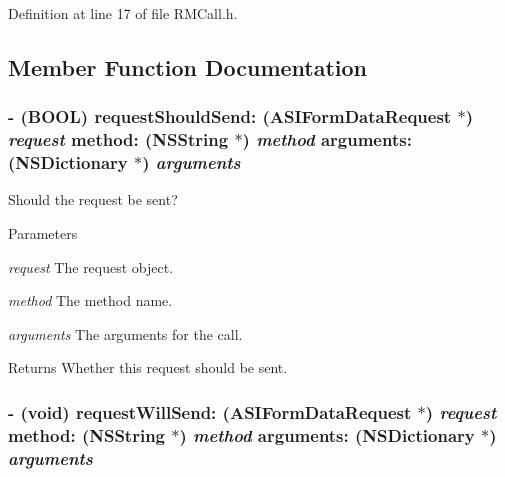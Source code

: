 Definition at line 17 of file RMCall.h.

\subsection{Member Function Documentation}
\hypertarget{protocol_r_m_call_protocol-p_a5656dcb18011d94f1d2de1e695741279}{
\subsubsection[{requestShouldSend:method:arguments:}]{\setlength{\rightskip}{0pt plus 5cm}-\/ (BOOL) requestShouldSend: (ASIFormDataRequest $\ast$) {\em request}\/ method: (NSString $\ast$) {\em method}\/ arguments: (NSDictionary $\ast$) {\em arguments}}}
\label{protocol_r_m_call_protocol-p_a5656dcb18011d94f1d2de1e695741279}


Should the request be sent? 
\begin{DoxyParams}{Parameters}
\item[{\em request}]The request object. \item[{\em method}]The method name. \item[{\em arguments}]The arguments for the call.\end{DoxyParams}
\begin{DoxyReturn}{Returns}
Whether this request should be sent. 
\end{DoxyReturn}
\hypertarget{protocol_r_m_call_protocol-p_a33f653fd32cbeae77545d77d7d80575c}{
\subsubsection[{requestWillSend:method:arguments:}]{\setlength{\rightskip}{0pt plus 5cm}-\/ (void) requestWillSend: (ASIFormDataRequest $\ast$) {\em request}\/ method: (NSString $\ast$) {\em method}\/ arguments: (NSDictionary $\ast$) {\em arguments}}}
\label{protocol_r_m_call_protocol-p_a33f653fd32cbeae77545d77d7d80575c}


